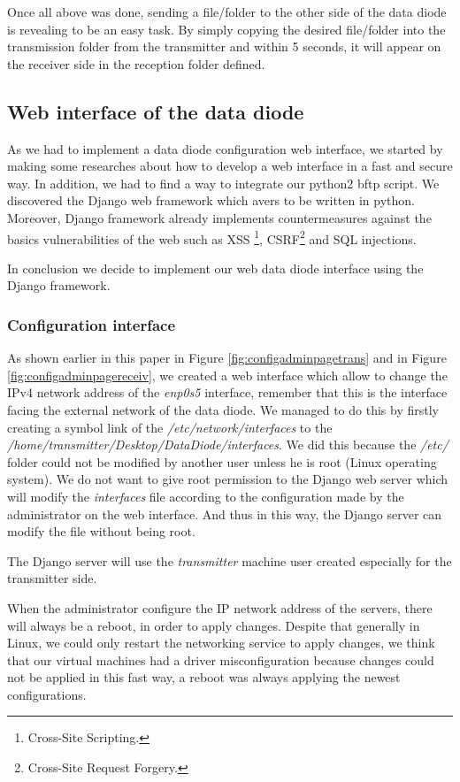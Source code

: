 \documentclass[a4paper,10pt]{article}
\begin{document}
Once all above was done, sending a file/folder to the other side of the data diode is revealing to be an easy task. By simply copying the desired file/folder into the transmission folder from the transmitter and within 5 seconds, it will appear on the receiver side in the reception folder defined.

\subsection{Web interface of the data diode}
As we had to implement a data diode configuration web interface, we started by making some researches about how to develop a web interface in a fast and secure way. In addition, we had to find a way to integrate our python2 bftp script. We discovered the Django web framework which avers to be written in python. Moreover, Django framework already implements countermeasures against the basics vulnerabilities of the web such as XSS \footnote{Cross-Site Scripting.}, CSRF\footnote{Cross-Site Request Forgery.} and SQL injections.

In conclusion we decide to implement our web data diode interface using the Django framework.

\subsubsection{Configuration interface}
As shown earlier in this paper in Figure \ref{fig:configadminpagetrans} and in Figure \ref{fig:configadminpagereceiv}, we created a web interface which allow to change the IPv4 network address of the \emph{enp0s5} interface, remember that this is the interface facing the external network of the data diode. We managed to do this by firstly creating a symbol link of the \emph{/etc/network/interfaces} to the \emph{/home/transmitter/Desktop/DataDiode/interfaces}. We did this because the \emph{/etc/} folder could not be modified by another user unless he is root (Linux operating system). We do not want to give root permission to the Django web server which will modify the \emph{interfaces} file according to the configuration made by the administrator on the web interface. And thus in this way, the Django server can modify the file without being root.

The Django server will use the \emph{transmitter} machine user created especially for the transmitter side.

When the administrator configure the IP network address of the servers, there will always be a reboot, in order to apply changes. Despite that generally in Linux, we could only restart the networking service to apply changes, we think that our virtual machines had a driver misconfiguration because changes could not be applied in this fast way, a reboot was always applying the newest configurations.
\end{document}

